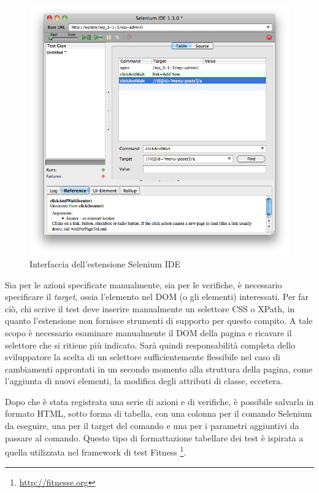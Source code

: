 \begin{figure}[htbp]
\begin{center}
\includegraphics[width=\textwidth]{images/selenium_screen.png}
\caption{Interfaccia dell'estensione Selenium IDE}
\label{fig:selenumScreen}
\end{center}
\end{figure}

Sia per le azioni specificate manualmente, sia per le verifiche, è necessario specificare il \emph{target}, ossia l'elemento nel DOM (o gli elementi) interessati. Per far ciò, chi scrive il test deve inserire manualmente un selettore CSS o XPath, in quanto l'estensione non fornisce strumenti di supporto per questo compito. A tale scopo è necessario esaminare manualmente il DOM della pagina e ricavare il selettore che si ritiene più indicato. Sarà quindi responsabilità completa dello sviluppatore la scelta di un selettore sufficientemente flessibile nel caso di cambiamenti approntati in un secondo momento alla struttura della pagina, come l'aggiunta di nuovi elementi, la modifica degli attributi di classe, eccetera. 

Dopo che è stata registrata una serie di azioni e di verifiche, è possibile salvarla in formato HTML, sotto forma di tabella, con una colonna per il comando Selenium da eseguire, una per il target del comando e una per i parametri aggiuntivi da passare al comando. Questo tipo di formattazione tabellare dei test è ispirata a quella utilizzata nel framework di test Fitness \footnote{\url{http://fitnesse.org}}.

